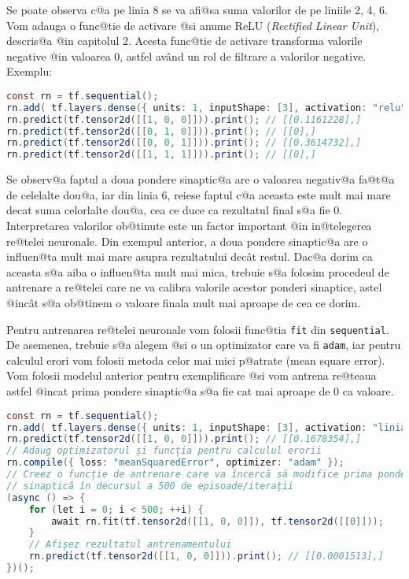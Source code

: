 Se poate observa c@a pe linia 8 se va afi@sa suma valorilor de pe liniile 2, 4, 6. Vom adauga o func@tie de activare @si anume ReLU (\textsl{Rectified Linear Unit}), descris@a @in capitolul 2. Acesta func@tie de activare transforma valorile negative @in valoarea 0, astfel av\^ and un rol de filtrare a valorilor negative. Exemplu:

\begin{lstlisting}[language=Java, caption={Exemplu de evaluare a unei simple rețele neuronale cu funcție de activare}]
const rn = tf.sequential();
rn.add( tf.layers.dense({ units: 1, inputShape: [3], activation: "relu", useBias: false }) );
rn.predict(tf.tensor2d([[1, 0, 0]])).print(); // [[0.1161228],] 
rn.predict(tf.tensor2d([[0, 1, 0]])).print(); // [[0],]
rn.predict(tf.tensor2d([[0, 0, 1]])).print(); // [[0.3614732],]
rn.predict(tf.tensor2d([[1, 1, 1]])).print(); // [[0],]
\end{lstlisting}

Se observ@a faptul a doua pondere sinaptic@a are o valoarea negativ@a fa@t@a de celelalte dou@a, iar din linia 6, reiese faptul c@a aceasta este mult mai mare decat suma celorlalte dou@a, cea ce duce ca rezultatul final s@a fie 0. Interpretarea valorilor ob@tinute este un factor important @in in@telegerea re@telei neuronale. Din exempul anterior, a doua pondere sinaptic@a are o influen@ta mult mai mare asupra rezultatului dec\^ at restul. Dac@a dorim ca aceasta s@a aiba o influen@ta mult mai mica, trebuie s@a folosim procedeul de antrenare a re@telei care ne va calibra valorile acestor ponderi sinaptice, astel @inc\^ at s@a ob@tinem o valoare finala mult mai aproape de cea ce dorim.

Pentru antrenarea re@telei neuronale vom folosii func@tia \texttt{fit} din \texttt{sequential}. De asemenea, trebuie s@a alegem @si o un optimizator care va fi \texttt{adam}, iar pentru calculul erori vom folosii metoda celor mai mici p@atrate (mean square error). Vom folosii modelul anterior pentru exemplificare @si vom antrena re@teaua astfel @incat prima pondere sinaptic@a s@a fie cat mai aproape de 0 ca valoare.

\begin{lstlisting}[language=Java, caption={Exemplu de antrenare a unei simple rețele neuronale cu funcție de activare}]
const rn = tf.sequential();
rn.add( tf.layers.dense({ units: 1, inputShape: [3], activation: "liniar", useBias: false }) );
rn.predict(tf.tensor2d([[1, 0, 0]])).print(); // [[0.1678354],] 
// Adaug optimizatorul și funcția pentru calculul erorii
rn.compile({ loss: "meanSquaredError", optimizer: "adam" });
// Creez o funcție de antrenare care va încercă să modifice prima pondere 
// sinaptică în decursul a 500 de episoade/iterații
(async () => {
	for (let i = 0; i < 500; ++i) {
		await rn.fit(tf.tensor2d([[1, 0, 0]]), tf.tensor2d([[0]]));
	}
	// Afișez rezultatul antrenamentului
	rn.predict(tf.tensor2d([[1, 0, 0]])).print(); // [[0.0001513],]
})();
\end{lstlisting}

